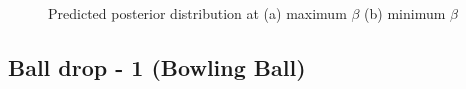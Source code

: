 \documentclass{article}
\begin{document}
\begin{figure}[H]
\begin{centering}
\,\,\,
\par\end{centering}

\caption{Predicted posterior distribution at (a) maximum $\beta$ (b) minimum
$\beta$}


\label{balldrop1t5-3-1}
\end{figure}



\subsection{Ball drop - 1 (Bowling Ball)}
\end{document}

